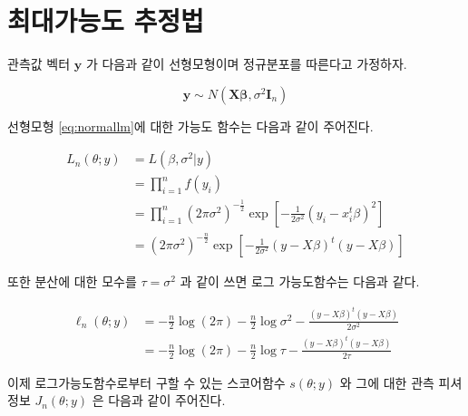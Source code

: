 \documentclass[
]{book}
\theoremstyle{definition}
\theoremstyle{definition}
\theoremstyle{definition}
\theoremstyle{remark}
\begin{document}
\hypertarget{uxcd5cuxb300uxac00uxb2a5uxb3c4-uxcd94uxc815uxbc95}{%
\section{최대가능도 추정법}\label{uxcd5cuxb300uxac00uxb2a5uxb3c4-uxcd94uxc815uxbc95}}

관측값 벡터 \(\bm y\) 가 다음과 같이 선형모형이며 정규분포를 따른다고 가정하자.

\begin{equation}
\bm y \sim N( \bm X \bm \beta, \sigma^2 \bm I_n) 
\label{eq:normallm}
\end{equation}

선형모형 \eqref{eq:normallm}에 대한 가능도 함수는 다음과 같이 주어진다.

\begin{align*}
 L_n( \theta ;  y) & = L( \beta,\sigma^2|  y) \\
   & = \prod^n_{i=1} f(y_i)\\
   & = \prod^n_{i=1}(2 \pi \sigma^2)^{-\frac{1}{2}} \exp \left [-\frac{1}{2\sigma^2} (y_i- x_i^t \beta)^2 \right ] \\
   & = (2\pi\sigma^2)^{-\frac{n}{2}} \exp \left [ -\frac{1}{2\sigma^2}( y- X  \beta)^t( y- X  \beta) \right ]
\end{align*}

또한 분산에 대한 모수를 \(\tau=\sigma^2\) 과 같이 쓰면 로그 가능도함수는 다음과 같다.

\begin{align*}
\ell_n( \theta; y) & = -\frac{n}{2} \log (2 \pi)-\frac{n}{2} \log \sigma^2 -\frac { ( y- X  \beta)^t ( y- X  \beta) }{2\sigma^2} \\ 
   &= -\frac{n}{2} \log (2 \pi)-\frac{n}{2} \log \tau -\frac { ( y- X  \beta)^t ( y- X  \beta) }{2\tau}  
\end{align*}

이제 로그가능도함수로부터 구할 수 있는 스코어함수 \(s( \theta;y)\) 와 그에 대한 관측 피셔정보 \(J_n( \theta; y)\) 은 다음과 같이 주어진다.
\end{document}
